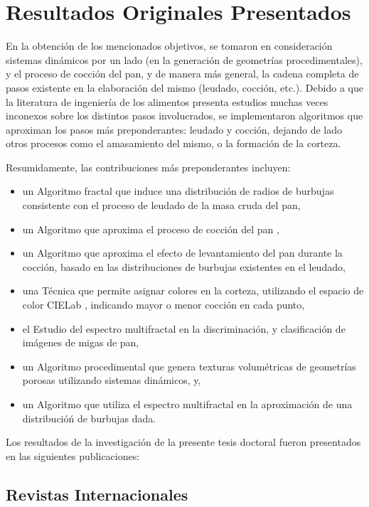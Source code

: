 \section{Resultados Originales Presentados}
En la obtención de los mencionados objetivos, se tomaron en consideración sistemas dinámicos por un lado (en la generación de geometrías procedimentales), y el proceso de cocción del pan, y de manera más general, la cadena completa de pasos existente en la elaboración del mismo (leudado, cocción, etc.).
Debido a que la literatura de ingeniería de los alimentos presenta estudios muchas veces inconexos sobre los distintos pasos involucrados, se implementaron algoritmos que aproximan los pasos más preponderantes: leudado y cocción, dejando de lado otros procesos como el amasamiento del mismo, o la formación de la corteza.

Resumidamente, las contribuciones más preponderantes incluyen:
\begin{itemize}
\item un Algoritmo fractal \cite{Mandelbrot1983} que induce una distribución de radios de burbujas consistente con el proceso de leudado de la masa cruda del pan,
\item un Algoritmo que aproxima el proceso de cocción del pan \cite{Powathil2004},
\item un Algoritmo que aproxima el efecto de levantamiento del pan durante la cocción, basado en las distribuciones de burbujas existentes en el leudado,
\item una Técnica que permite asignar colores en la corteza, utilizando el espacio de color CIELab \cite{Hunter58}, indicando mayor o menor cocción en cada punto,
\item el Estudio del espectro multifractal \cite{Xu2009} en la discriminación, y clasificación de imágenes de migas de pan,
\item un Algoritmo procedimental que genera texturas volumétricas de geometrías porosas utilizando sistemas dinámicos, y,
\item un Algoritmo que utiliza el espectro multifractal en la aproximación de una distribucióń de burbujas dada.
\end{itemize}

Los resultados de la investigación de la presente tesis doctoral fueron presentados en las siguientes publicaciones:

\subsection*{Revistas Internacionales}

